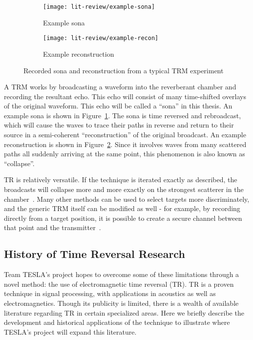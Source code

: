 \begin{figure}[h!]
    \centering
    \begin{subfigure}{.45\textwidth}
        \centering
        \texttt{[image: lit-review/example-sona]}
        \caption[Example sona]{Example sona}
         \label{fig:lit-review-example-sona}
    \end{subfigure}
    \begin{subfigure}{.45\textwidth}
        \centering
        \texttt{[image: lit-review/example-recon]}
        \caption[Example reconstruction]{Example reconstruction}
         \label{fig:lit-review-example-recon}
    \end{subfigure}
    \caption{Recorded sona and reconstruction from a typical TRM experiment}
    \label{fig:lit-review-example}
\end{figure}

A TRM works by broadcasting a waveform into the reverberant chamber and recording the resultant echo. This echo will consist of many time-shifted overlays of the original waveform. This echo will be called a ``sona'' in this thesis. An example sona is shown in Figure~\ref{fig:lit-review-example-sona}. The sona is time reversed and rebroadcast, which will cause the waves to trace their paths in reverse and return to their source in a semi-coherent ``reconstruction'' of the original broadcast. An example reconstruction is shown in Figure~\ref{fig:lit-review-example-recon}. Since it involves waves from many scattered paths all suddenly arriving at the same point, this phenomenon is also known as ``collapse''.

TR is relatively versatile. If the technique is iterated exactly as described, the broadcasts will collapse more and more exactly on the strongest scatterer in the chamber~\cite{fink_time-reversed_1999}. Many other methods can be used to select targets more discriminately, and the generic TRM itself can be modified as well - for example, by recording directly from a target position, it is possible to create a secure channel between that point and the transmitter~\cite{nltr-wave-chaotic}.

\subsection{History of Time Reversal Research}

Team TESLA’s project hopes to overcome some of these limitations through a novel method: the use of electromagnetic time reversal (TR). TR is a proven technique in signal processing, with applications in acoustics as well as electromagnetics. Though its publicity is limited, there is a wealth of available literature regarding TR in certain specialized areas. Here we briefly describe the development and historical applications of the technique to illustrate where TESLA’s project will expand this literature.

